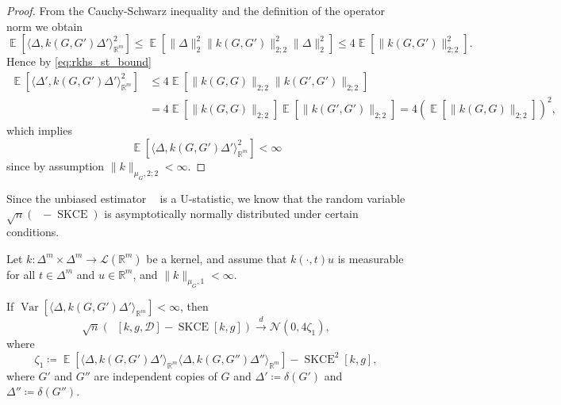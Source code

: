 \documentclass{article}
\DeclareMathOperator{\Expect}{\mathbb{E}}
\DeclareMathOperator{\Var}{Var}
\DeclareMathOperator{\squaredkernelmeasure}{SKCE}
\DeclareMathOperator{\unbiasedestimator}{\widehat{SKCE}_{uq}}
\begin{document}
\begin{proof}
  From the Cauchy-Schwarz inequality and the definition of the operator norm we
  obtain
  \begin{equation*}
    \Expect[\langle \Delta, k(G,G') \Delta'\rangle_{\mathbb{R}^m}^2] \leq
    \Expect[\|\Delta\|^2_2 \|k(G,G')\|^2_{2;2} \|\Delta\|^2_2] \leq 4 \Expect[\|k(G,G')\|^2_{2;2}].
  \end{equation*}
  Hence by \cref{eq:rkhs_st_bound}
  \begin{equation*}
    \begin{split}
      \Expect[\langle \Delta', k(G,G') \Delta' \rangle_{\mathbb{R}^m}^2] &\leq 4 \Expect[\|k(G,G)\|_{2;2} \|k(G',G')\|_{2;2}] \\
      &= 4 \Expect[\|k(G,G)\|_{2;2}] \Expect[\|k(G',G')\|_{2;2}] = 4 {\left(\Expect[\|k(G,G)\|_{2;2}]\right)}^2,
    \end{split}
  \end{equation*}
  which implies
  \begin{equation*}
    \Expect[\langle \Delta, k(G,G') \Delta' \rangle_{\mathbb{R}^m}^2] < \infty
  \end{equation*}
  since by assumption $\|k\|_{\mu_G,2;2} < \infty$.
\end{proof}

Since the unbiased estimator $\unbiasedestimator$ is a U-statistic, we know that
the random variable $\sqrt{n}(\unbiasedestimator - \squaredkernelmeasure)$ is
asymptotically normally distributed under certain conditions.

\begin{theorem}\label{thm:quadratic_asymptotic}
  Let $k \colon \Delta^m \times \Delta^m \to \mathcal{L}(\mathbb{R}^m)$ be a
  kernel, and assume that $k(\cdot,t) u$ is measurable for all $t \in \Delta^m$
  and $u \in \mathbb{R}^m$, and $\|k\|_{\mu_G,1} < \infty$.

  If $\Var[\langle \Delta, k(G,G') \Delta'\rangle_{\mathbb{R}^m}] < \infty$,
  then
  \begin{equation*}
    \sqrt{n} \left(\unbiasedestimator[k, g, \mathcal{D}] - \squaredkernelmeasure[k, g]\right) \xrightarrow{d} \mathcal{N}(0, 4\zeta_1),
  \end{equation*}
  where
  \begin{equation*}
    \zeta_1 \coloneqq \Expect[\langle \Delta, k(G,G') \Delta' \rangle_{\mathbb{R}^m} \langle \Delta, k(G,G'') \Delta'' \rangle_{\mathbb{R}^m}] - \squaredkernelmeasure^2[k, g],
  \end{equation*}
  where $G'$ and $G''$ are independent copies of $G$ and
  $\Delta' \coloneqq \delta(G')$ and $\Delta'' \coloneqq \delta(G'')$.
\end{theorem}
\end{document}
